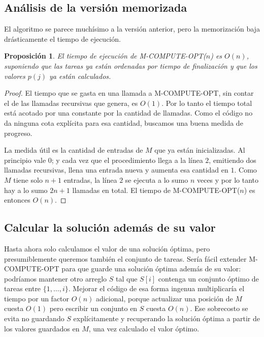 \documentclass[12pt, spanish, oneside, openany]{book}
\newcommand{\alg}[1]{#1}
\theoremstyle{uprightplain}
\newtheorem{proposicion}[teorema]{Proposición}
\theoremstyle{definition}
\theoremstyle{remark}
\theoremstyle{definition}
\begin{document}
\subsection{Análisis de la versión memorizada}

El algoritmo se parece muchísimo a la versión anterior, pero la memorización baja drásticamente el tiempo de ejecución.

\begin{proposicion}
\label{prop:dp-memo-lineal}
El tiempo de ejecución de \alg{M-COMPUTE-OPT}($n$) es $O(n)$, suponiendo que las tareas ya están ordenadas por tiempo de finalización y que los valores $p(j)$ ya están calculados.
\end{proposicion}
\begin{proof}
El tiempo que se gasta en una llamada a \alg{M-COMPUTE-OPT}, sin contar el de las llamadas recursivas que genera, es $O(1)$. Por lo tanto el tiempo total está acotado por una constante por la cantidad de llamadas. Como el código no da ninguna cota explícita para esa cantidad, buscamos una buena medida de progreso.

La medida útil es la cantidad de entradas de $M$ que ya están inicializadas. Al principio vale $0$; y cada vez que el procedimiento llega a la línea $2$, emitiendo dos llamadas recursivas, llena una entrada nueva y aumenta esa cantidad en $1$. Como $M$ tiene solo $n+1$ entradas, la línea $2$ se ejecuta a lo sumo $n$ veces y por lo tanto hay a lo sumo $2n+1$ llamadas en total. El tiempo de \alg{M-COMPUTE-OPT}($n$) es entonces $O(n)$.
\end{proof}

\subsection{Calcular la solución además de su valor}

Hasta ahora solo calculamos el valor de una solución óptima, pero presumiblemente queremos también el conjunto de tareas. Sería fácil extender \alg{M-COMPUTE-OPT} para que guarde una solución óptima además de su valor: podríamos mantener otro arreglo $S$ tal que $S[i]$ contenga un conjunto óptimo de tareas entre $\{1,\dots,i\}$. Mejorar el código de esa forma ingenua multiplicaría el tiempo por un factor $O(n)$ adicional, porque actualizar una posición de $M$ cuesta $O(1)$ pero escribir un conjunto en $S$ cuesta $O(n)$. Ese sobrecosto se evita no guardando $S$ explícitamente y recuperando la solución óptima a partir de los valores guardados en $M$, una vez calculado el valor óptimo.
\end{document}
